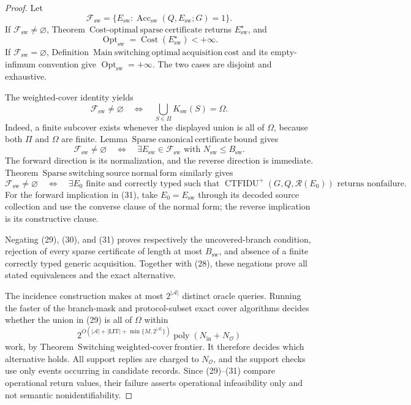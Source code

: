 \documentclass{article}
\begin{document}
\begin{proof}
Let
\[
 \mathcal F_{\mathrm{sw}}
 =\{E_{\mathrm{sw}}:\operatorname{Acc}_{\mathrm{sw}}(Q,E_{\mathrm{sw}};G)=1\}.
 \tag{27}
\]
If \(\mathcal F_{\mathrm{sw}}\ne\varnothing\), Theorem~\(\mathrm{Cost\mbox{-}optimal\ sparse\ certificate}\) returns \(E_{\mathrm{sw}}^{\star}\), and
\[
 \operatorname{Opt}_{\mathrm{sw}}
 =\operatorname{Cost}(E_{\mathrm{sw}}^{\star})<+\infty.
 \tag{28}
\]
If \(\mathcal F_{\mathrm{sw}}=\varnothing\), Definition~\(\mathrm{Main\ switching\ optimal\ acquisition\ cost}\) and its empty-infimum convention give \(\operatorname{Opt}_{\mathrm{sw}}=+\infty\).  The two cases are disjoint and exhaustive.

The weighted-cover identity yields
\[
 \mathcal F_{\mathrm{sw}}\ne\varnothing
 \quad\Longleftrightarrow\quad
 \bigcup_{S\in\Pi}K_{\mathrm{sw}}(S)=\Omega.
 \tag{29}
\]
Indeed, a finite subcover exists whenever the displayed union is all of \(\Omega\), because both \(\Pi\) and \(\Omega\) are finite.  Lemma~\(\mathrm{Sparse\ canonical\ certificate\ bound}\) gives
\[
 \mathcal F_{\mathrm{sw}}\ne\varnothing
 \quad\Longleftrightarrow\quad
 \exists E_{\mathrm{sw}}\in\mathcal F_{\mathrm{sw}}
 \text{ with }N_{\mathrm{sw}}\leq B_{\mathrm{sw}}.
 \tag{30}
\]
The forward direction is its normalization, and the reverse direction is immediate.  Theorem~\(\mathrm{Sparse\ switching\ source\ normal\ form}\) similarly gives
\[
 \mathcal F_{\mathrm{sw}}\ne\varnothing
 \quad\Longleftrightarrow\quad
 \exists E_0\text{ finite and correctly typed such that }
 \operatorname{CTFIDU}^{+}(G,Q,\mathcal R(E_0))
 \text{ returns nonfailure}.
 \tag{31}
\]
For the forward implication in (31), take \(E_0=E_{\mathrm{sw}}\) through its decoded source collection and use the converse clause of the normal form; the reverse implication is its constructive clause.

Negating (29), (30), and (31) proves respectively the uncovered-branch condition, rejection of every sparse certificate of length at most \(B_{\mathrm{sw}}\), and absence of a finite correctly typed generic acquisition.  Together with (28), these negations prove all stated equivalences and the exact alternative.

The incidence construction makes at most \(2^{|\mathcal A|}\) distinct oracle queries.  Running the faster of the branch-mask and protocol-subset exact cover algorithms decides whether the union in (29) is all of \(\Omega\) within
\[
 2^{O(|\mathcal A|+|\mathrm{LIT}|+\min\{M,2^{|\mathcal A|}\})}
 \operatorname{poly}(N_{\mathrm{in}}+N_{\mathcal O})
 \tag{32}
\]
work, by Theorem~\(\mathrm{Switching\ weighted\mbox{-}cover\ frontier}\).  It therefore decides which alternative holds.  All support replies are charged to \(N_{\mathcal O}\), and the support checks use only events occurring in candidate records.  Since (29)--(31) compare operational return values, their failure asserts operational infeasibility only and not semantic nonidentifiability.
\end{proof}
\end{document}
